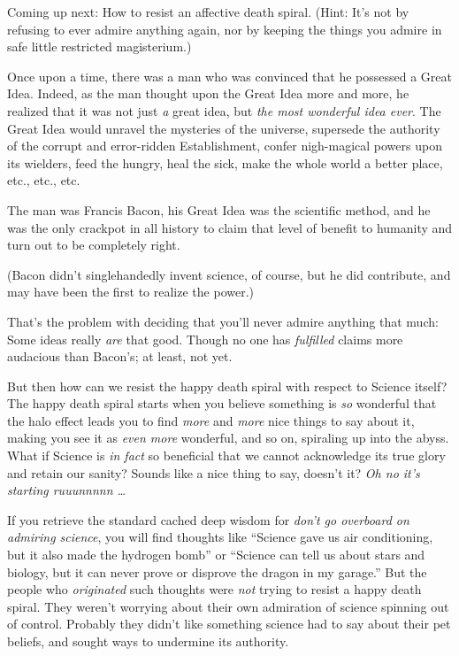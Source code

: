 {
 Coming up next: How to resist an affective death spiral. (Hint:
It's not by refusing to ever admire anything again, nor
by keeping the things you admire in safe little restricted
magisterium.)}

\myendsectiontext


{
 Once upon a time, there was a man who was convinced that he
possessed a Great Idea. Indeed, as the man thought upon the Great Idea
more and more, he realized that it was not just \textit{a} great idea,
but \textit{the most wonderful idea ever}. The Great Idea would unravel
the mysteries of the universe, supersede the authority of the corrupt
and error-ridden Establishment, confer nigh-magical powers upon its
wielders, feed the hungry, heal the sick, make the whole world a better
place, etc., etc., etc. }

{
 The man was Francis Bacon, his Great Idea was the scientific
method, and he was the only crackpot in all history to claim that level
of benefit to humanity and turn out to be completely right.}

{
 (Bacon didn't singlehandedly invent science, of
course, but he did contribute, and may have been the first to realize
the power.)}

{
 That's the problem with deciding that
you'll never admire anything that much: Some ideas
really \textit{are} that good. Though no one has \textit{fulfilled}
claims more audacious than Bacon's; at least, not yet.}

{
 But then how can we resist the happy death spiral with respect to
Science itself? The happy death spiral starts when you believe
something is \textit{so} wonderful that the halo effect leads you to
find \textit{more} and \textit{more} nice things to say about it,
making you see it as \textit{even more} wonderful, and so on, spiraling
up into the abyss. What if Science is \textit{in fact} so beneficial
that we cannot acknowledge its true glory and retain our sanity? Sounds
like a nice thing to say, doesn't it? \textit{Oh no
it's starting ruuunnnnn \ldots}}

{
 If you retrieve the standard cached deep wisdom for
\textit{don't go overboard on admiring science}, you
will find thoughts like ``Science gave us air
conditioning, but it also made the hydrogen bomb'' or
``Science can tell us about stars and biology, but it
can never prove or disprove the dragon in my
garage.'' But the people who \textit{originated} such
thoughts were \textit{not} trying to resist a happy death spiral. They
weren't worrying about their own admiration of science
spinning out of control. Probably they didn't like
something science had to say about their pet beliefs, and sought ways
to undermine its authority.}

